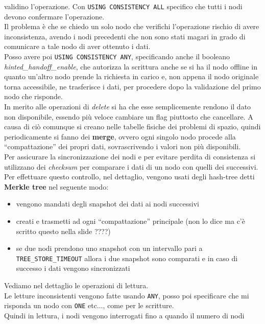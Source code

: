 \documentclass[a4paper,12pt, oneside]{book}
\begin{document}
validino l'operazione. Con \texttt{USING CONSISTENCY ALL} specifico che tutti
i nodi devono confermare l'operazione.\\
Il problema è che se chiedo un solo nodo che verifichi l'operazione rischio di
avere inconsistenza, avendo i nodi precedenti che non sono stati magari in grado
di comunicare a tale nodo di aver ottenuto i dati.\\
Posso avere poi \texttt{USING CONSISTENCY ANY}, specificando anche il booleano
\textit{hinted\_handoff\_enable}, che autorizza la scrittura anche se si ha il
nodo offline in quanto un'altro nodo prende la richiesta in carico e, non appena
il nodo originale torna accessibile, ne trasferisce i dati, per procedere dopo
la validazione del primo nodo che risponde.\\
In merito alle operazioni di \textit{delete} si ha che esse semplicemente
rendono il dato non disponibile, essendo più veloce cambiare un flag piuttosto
che cancellare. A causa di ciò comunque si creano nelle tabelle fisiche dei
problemi di spazio, quindi periodicamente si fanno dei \textbf{merge}, ovvero
ogni singolo nodo procede alla ``compattazione'' dei propri dati, sovrascrivendo
i valori non più disponibili.\\
Per assicurare la sincronizzazione dei nodi e per evitare perdita di consistenza
si utilizzano dei \textit{checksum} per comparare i dati di un nodo con quelli
dei successivi. Per effettuare questo controllo, nel dettaglio, vengono usati
degli hash-tree detti \textbf{Merkle tree} nel seguente modo:
\begin{itemize}
  \item vengono mandati degli snapshot dei dati ai nodi successivi
  \item creati e trasmetti ad ogni ``compattazione'' principale (non lo dice ma
  c'è scritto questo nella slide ????)
  \item se due nodi prendono uno snapshot con un intervallo pari a\\
  \texttt{TREE\_STORE\_TIMEOUT} allora i due snapshot sono comparati e in caso
  di successo i dati vengono sincronizzati
  
\end{itemize}
Vediamo nel dettaglio le operazioni di lettura.\\
Le letture inconsistenti vengono fatte usando \texttt{ANY}, posso poi
specificare che mi risponda un nodo con \texttt{ONE} etc$\ldots$, come per le
scritture.\\
Quindi in lettura, i nodi vengono interrogati fino a quando il numero di nodi
\end{document}
